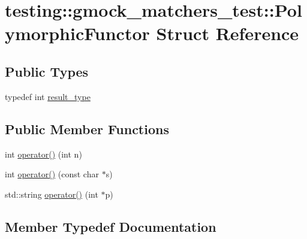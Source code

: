 \hypertarget{structtesting_1_1gmock__matchers__test_1_1PolymorphicFunctor}{}\section{testing\+::gmock\+\_\+matchers\+\_\+test\+::Polymorphic\+Functor Struct Reference}
\label{structtesting_1_1gmock__matchers__test_1_1PolymorphicFunctor}
\subsection*{Public Types}
\begin{DoxyCompactItemize}
\item 
typedef int \mbox{\hyperlink{structtesting_1_1gmock__matchers__test_1_1PolymorphicFunctor_ae2b921ecae158b5eaa11a29ac6fe0cf3}{result\+\_\+type}}
\end{DoxyCompactItemize}
\subsection*{Public Member Functions}
\begin{DoxyCompactItemize}
\item 
int \mbox{\hyperlink{structtesting_1_1gmock__matchers__test_1_1PolymorphicFunctor_a2fb8b012acd2ccd52788231036877c98}{operator()}} (int n)
\item 
int \mbox{\hyperlink{structtesting_1_1gmock__matchers__test_1_1PolymorphicFunctor_aee4d200c7f85ce4d8048d1798a511002}{operator()}} (const char $\ast$s)
\item 
std\+::string \mbox{\hyperlink{structtesting_1_1gmock__matchers__test_1_1PolymorphicFunctor_afadd033a9ae644f159fff6c14a247a70}{operator()}} (int $\ast$p)
\end{DoxyCompactItemize}


\subsection{Member Typedef Documentation}
\mbox{\label{structtesting_1_1gmock__matchers__test_1_1PolymorphicFunctor_ae2b921ecae158b5eaa11a29ac6fe0cf3}} 
